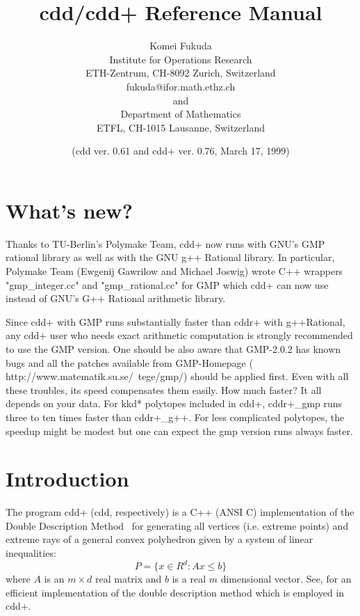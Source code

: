 \documentclass[11pt]{article}
\begin{document}
\title{cdd/cdd+ Reference Manual}
\author{
Komei Fukuda \\
Institute for Operations Research\\
ETH-Zentrum, CH-8092 Zurich, Switzerland\\
fukuda@ifor.math.ethz.ch \\and\\
Department of Mathematics\\
ETFL, CH-1015 Lausanne, Switzerland}
\date{ (cdd ver. 0.61 and cdd+ ver. 0.76,  March 17, 1999)}

\maketitle

\section{What's new?}

Thanks to TU-Berlin's Polymake Team, cdd+ now runs with GNU's
GMP rational library as well as with the GNU g++ Rational library.
In particular, Polymake Team (Ewgenij Gawrilow and Michael Joswig)
wrote C++ wrappers "gmp\_integer.cc" and "gmp\_rational.cc" for GMP 
which cdd+ can now use instead of GNU's G++ Rational arithmetic library.
 
Since cdd+ with GMP runs substantially faster 
than cddr+ with g++Rational, any cdd+ user who needs exact arithmetic
computation is strongly recommended to use the GMP version.
One should be also aware that GMP-2.0.2 has known bugs and
all the patches available from GMP-Homepage 
(
{http://www.matematik.su.se/~tege/gmp/})
 should be applied first.
Even with all these troubles, its speed compensates them easily.
How much faster?  It all depends on your data.  For kkd* polytopes
included in cdd+, cddr+\_gmp runs three to ten times faster than
cddr+\_g++.  For less complicated polytopes, the speedup might be modest
but one can expect the gmp version runs always faster.

\section{Introduction} \label{INTRODUCTION}

The program  cdd+  (cdd, respectively)   is 
a C++  (ANSI C) implementation of 
the Double Description Method~\cite{mrtt-ddm-53}
for generating all vertices (i.e. extreme points)
and extreme rays of a general 
convex polyhedron given by a system of linear inequalities:
\[
   P = \{ x  \in R^d:  A  x  \le  b \}
\]
where $A$ is an $m \times d$ real matrix and $b$ is a real
$m$ dimensional vector.   See, \cite{fp-ddmr-96} for
an efficient implementation of the double description
method which is employed in cdd+.
\end{document}
